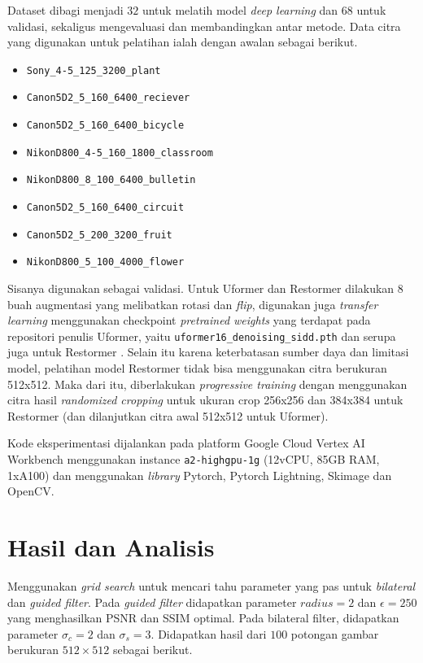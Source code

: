 \documentclass[11pt, a4paper, final]{report}
\begin{document}
Dataset dibagi menjadi $32$ untuk melatih model \textit{deep learning} dan $68$ untuk validasi, sekaligus mengevaluasi dan membandingkan antar metode. Data citra yang digunakan untuk pelatihan ialah dengan awalan sebagai berikut.

\begin{itemize}[noitemsep]
    \item \texttt{Sony\_4-5\_125\_3200\_plant}
    \item \texttt{Canon5D2\_5\_160\_6400\_reciever}
    \item \texttt{Canon5D2\_5\_160\_6400\_bicycle}
    \item \texttt{NikonD800\_4-5\_160\_1800\_classroom}
    \item \texttt{NikonD800\_8\_100\_6400\_bulletin}
    \item \texttt{Canon5D2\_5\_160\_6400\_circuit}
    \item \texttt{Canon5D2\_5\_200\_3200\_fruit}
    \item \texttt{NikonD800\_5\_100\_4000\_flower}
\end{itemize}

Sisanya digunakan sebagai validasi. Untuk Uformer dan Restormer dilakukan $8$ buah augmentasi yang melibatkan rotasi dan \textit{flip}, digunakan juga \textit{transfer learning} menggunakan checkpoint \textit{pretrained weights} yang terdapat pada repositori penulis Uformer, yaitu \texttt{uformer16\_denoising\_sidd.pth} dan serupa juga untuk Restormer \cite{wang2021uformer}. Selain itu karena keterbatasan sumber daya dan limitasi model, pelatihan model Restormer tidak bisa menggunakan citra berukuran 512x512. Maka dari itu, diberlakukan \textit{progressive training} dengan menggunakan citra hasil \textit{randomized cropping} untuk ukuran crop 256x256 dan 384x384 untuk Restormer (dan dilanjutkan citra awal 512x512 untuk Uformer).

Kode eksperimentasi dijalankan pada platform Google Cloud Vertex AI Workbench menggunakan instance \texttt{a2-highgpu-1g} (12vCPU, 85GB RAM, 1xA100) dan menggunakan \textit{library} Pytorch, Pytorch Lightning, Skimage dan OpenCV.

\section{Hasil dan Analisis}

Menggunakan \textit{grid search} untuk mencari tahu parameter yang pas untuk \textit{bilateral} dan \textit{guided filter}. Pada \textit{guided filter} didapatkan parameter $radius = 2$ dan $\epsilon = 250$ yang menghasilkan PSNR dan SSIM optimal. Pada bilateral filter, didapatkan parameter $\sigma_c = 2$ dan $\sigma_s = 3$. Didapatkan hasil dari $100$ potongan gambar berukuran $512 \times 512$ sebagai berikut.
\end{document}
